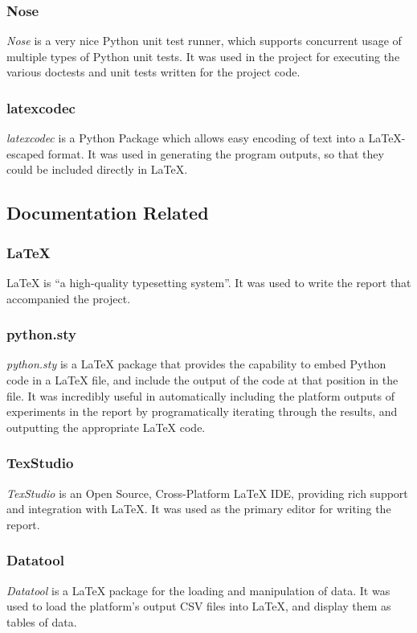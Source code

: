 \documentclass[a4paper,11pt]{report}
\begin{document}
\subsubsection*{Nose}
\emph{Nose} \citep{prog:nose} is a very nice Python unit test runner, which supports concurrent usage of multiple types of Python unit tests. It was used in the project for executing the various doctests and unit tests written for the project code.

\subsubsection*{latexcodec}
\emph{latexcodec} \citep{prog:latexcodec} is a Python Package which allows easy encoding of text into a \LaTeX{}-escaped format. It was used in generating the program outputs, so that they could be included directly in \LaTeX{}.

\subsection{Documentation Related}

\subsubsection*{\LaTeX{}}
\LaTeX{} \citep{prog:latex} is ``a high-quality typesetting system''. It was used to write the report that accompanied the project.

\subsubsection*{python.sty}
\emph{python.sty} \citep{prog:pythonsty} is a \LaTeX{} package that provides the capability to embed Python code in a \LaTeX{} file, and include the output of the code at that position in the file. It was incredibly useful in automatically including the platform outputs of experiments in the report by programatically iterating through the results, and outputting the appropriate \LaTeX{} code.

\subsubsection*{TexStudio}
\emph{TexStudio} \citep{prog:texstudio} is an Open Source, Cross-Platform \LaTeX{} IDE, providing rich support and integration with \LaTeX{}. It was used as the primary editor for writing the report.

\subsubsection*{Datatool}
\emph{Datatool} \citep{prog:datatool} is a \LaTeX{} package for the loading and manipulation of data. It was used to load the platform's output CSV files into \LaTeX{}, and display them as tables of data.
\end{document}

